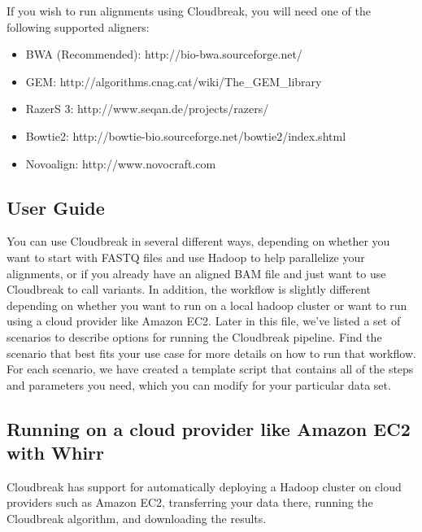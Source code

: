 \documentclass[11pt]{article}
\begin{document}
If you wish to run alignments using Cloudbreak, you will need one of the following
supported aligners:

\begin{itemize}
\item BWA (Recommended): http:/\slash bio-bwa.sourceforge.net\slash 

\item GEM: http:/\slash algorithms.cnag.cat\slash wiki\slash The\_GEM\_library

\item RazerS 3: http:/\slash www.seqan.de\slash projects\slash razers\slash 

\item Bowtie2: http:/\slash bowtie-bio.sourceforge.net\slash bowtie2\slash index.shtml

\item Novoalign: http:/\slash www.novocraft.com

\end{itemize}

\subsection{User Guide}
\label{userguide}

You can use Cloudbreak in several different ways, depending on whether you want
to start with FASTQ files and use Hadoop to help parallelize your alignments, or if you already
have an aligned BAM file and just want to use Cloudbreak to call variants. In addition,
the workflow is slightly different depending on whether you want to run on a local
hadoop cluster or want to run using a cloud provider like Amazon EC2. Later in this
file, we've listed a set of scenarios to describe options for running the Cloudbreak
pipeline. Find the scenario that best fits your use case for more details on how to
run that workflow. For each scenario, we have created a template script that contains
all of the steps and parameters you need, which you can modify for your particular data set.

\subsection{Running on a cloud provider like Amazon EC2 with Whirr}
\label{runningonacloudproviderlikeamazonec2withwhirr}

Cloudbreak has support for automatically deploying a Hadoop cluster on
cloud providers such as Amazon EC2, transferring your data there, running the Cloudbreak algorithm, and
downloading the results.
\end{document}
